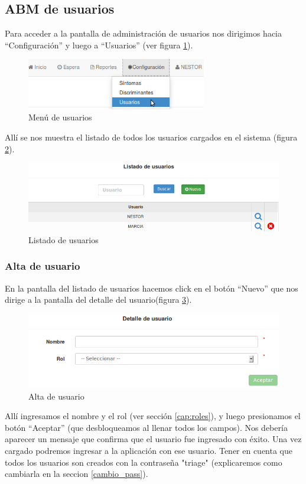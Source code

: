 \subsection{ABM de usuarios}\label{ABM_usuarios}
Para acceder a la pantalla de administración de usuarios nos dirigimos hacia ``Configuración'' y luego a ``Usuarios'' (ver figura \ref{fig:menu_usuarios}).
\begin{figure}
\centerline{\includegraphics[width=0.7\textwidth]{menu_usuarios.png}}
\caption{Menú de usuarios}
\label{fig:menu_usuarios}
\end{figure}
Allí se nos muestra el listado de todos los usuarios cargados en el sistema (figura \ref{fig:listado_usuarios}).
\begin{figure}
\centerline{\includegraphics[width=1\textwidth]{listado_usuarios.png}}
\caption{Listado de usuarios}
\label{fig:listado_usuarios}
\end{figure}

\subsubsection{Alta de usuario}\label{cap:alta_usuario}
En la pantalla del listado de usuarios hacemos click en el botón ``Nuevo'' que nos dirige a la pantalla del detalle del usuario(figura \ref{fig:nuevo_usuario}).
\begin{figure}
\centerline{\includegraphics[width=1\textwidth]{nuevo_usuario.png}}
\caption{Alta de usuario}
\label{fig:nuevo_usuario}
\end{figure}
Allí ingresamos el nombre y el rol (ver sección \ref{cap:roles}), y luego presionamos el botón ``Aceptar'' (que desbloqueamos al llenar todos los campos). Nos debería aparecer un mensaje que confirma que el usuario fue ingresado con éxito. Una vez cargado podremos ingresar a la aplicación con ese usuario. Tener en cuenta que todos los usuarios son creados con la contraseña "triage" (explicaremos como cambiarla en la seccion \ref{cambio_pass}).

